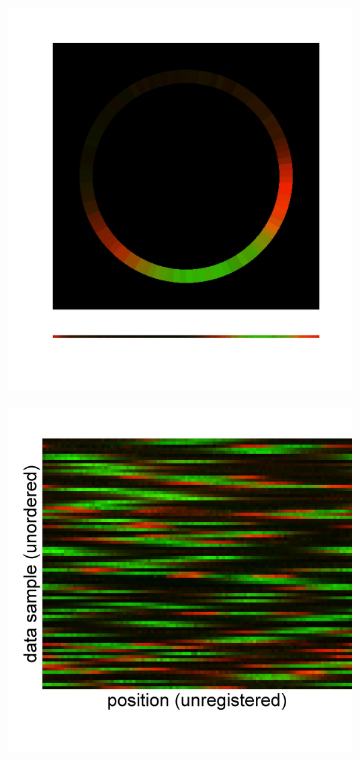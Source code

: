 \documentclass{pnastwo}
\begin{document}
\begin{figure}
\begin{subfigure}{0.17\textwidth}
\includegraphics[width=\textwidth]{illustrate_1d}
\caption{}
\label{subfig:1d_image_example}
\end{subfigure}
\begin{subfigure}{0.2\textwidth}
\includegraphics[width=\textwidth]{unregistered_unordered_1d}

\end{subfigure}
\end{figure}
\end{document}

